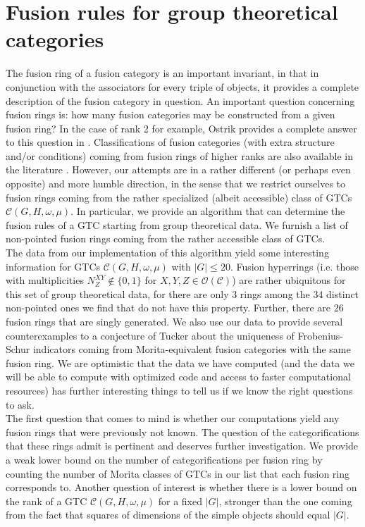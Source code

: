 \documentclass[a4paper, 10pt]{book}
\theoremstyle{definition}
\numberwithin{equation}{chapter}
\newcommand\C{\mathcal C}
\newcommand\OO{\mathcal O}
\begin{document}
\chapter{Fusion rules for group theoretical categories}\label{chp4}
The fusion ring of a fusion category is an important invariant, in that in conjunction with the associators for every triple of objects, it provides a complete description of the fusion category in question. An important question concerning fusion rings is: how many fusion categories may be constructed from a given fusion ring? In the case of rank 2 for example, Ostrik provides a complete answer to this question in \cite{O}. Classifications of fusion categories (with extra structure and/or conditions) coming from fusion rings of higher ranks are also available in the literature \cite{MR2422269,MR3427429}. However, our attempts are in a rather different (or perhaps even opposite) and more humble direction, in the sense that we restrict ourselves to fusion rings coming from the rather specialized (albeit accessible) class of GTCs $\C(G, H, \omega, \mu)$. In particular, we provide an algorithm that can determine the fusion rules of a GTC starting from group theoretical data. We furnish a list of non-pointed fusion rings coming from the rather accessible class of GTCs. \\
The data from our implementation of this algorithm yield some interesting information for GTCs $\C(G, H, \omega, \mu)$ with $|G|\leq 20$. Fusion hyperrings (i.e. those with multiplicities $N_Z^{X Y}\not\in \{0, 1\}$ for $X, Y, Z \in \OO(\C)$) are rather ubiquitous for this set of group theoretical data, for there are only 3 rings among the 34 distinct non-pointed ones we find that do not have this property. Further, there are 26 fusion rings that are singly generated. We also use our data to provide several counterexamples to a conjecture of Tucker \cite{MR4044867} about the uniqueness of Frobenius-Schur indicators coming from Morita-equivalent fusion categories with the same fusion ring. We are optimistic that the data we have computed (and the data we will be able to compute with optimized code and access to faster computational resources) has further interesting things to tell us if we know the right questions to ask.\\
The first question that comes to mind is whether our computations yield any fusion rings that were previously not known. The question of the categorifications that these rings admit is pertinent and deserves further investigation. We provide a weak lower bound on the number of categorifications per fusion ring by counting the number of Morita classes of GTCs in our list that each fusion ring corresponds to. Another question of interest is whether there is a lower bound on the rank of a GTC $\C(G, H, \omega, \mu)$ for a fixed $|G|$, stronger than the one coming from the fact that squares of dimensions of the simple objects should equal $|G|$. \\
\end{document}
